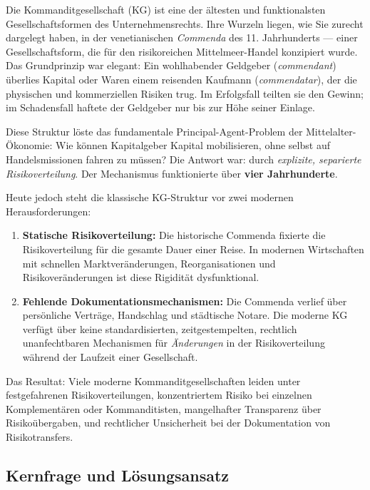 \documentclass[a4paper,12pt]{article}
\theoremstyle{definition}
\begin{document}
Die Kommanditgesellschaft (KG) ist eine der ältesten und funktionalsten Gesellschaftsformen des Unternehmensrechts. Ihre Wurzeln liegen, wie Sie zurecht dargelegt haben, in der venetianischen \emph{Commenda} des 11. Jahrhunderts --- einer Gesellschaftsform, die für den risikoreichen Mittelmeer-Handel konzipiert wurde. Das Grundprinzip war elegant: Ein wohlhabender Geldgeber (\emph{commendant}) überlies Kapital oder Waren einem reisenden Kaufmann (\emph{commendatar}), der die physischen und kommerziellen Risiken trug. Im Erfolgsfall teilten sie den Gewinn; im Schadensfall haftete der Geldgeber nur bis zur Höhe seiner Einlage.

Diese Struktur löste das fundamentale Principal-Agent-Problem der Mittelalter-Ökonomie: Wie können Kapitalgeber Kapital mobilisieren, ohne selbst auf Handelsmissionen fahren zu müssen? Die Antwort war: durch \emph{explizite, separierte Risikoverteilung}. Der Mechanismus funktionierte über \textbf{vier Jahrhunderte}.

Heute jedoch steht die klassische KG-Struktur vor zwei modernen Herausforderungen:

\begin{enumerate}
    \item \textbf{Statische Risikoverteilung:} Die historische Commenda fixierte die Risikoverteilung für die gesamte Dauer einer Reise. In modernen Wirtschaften mit schnellen Marktveränderungen, Reorganisationen und Risikoveränderungen ist diese Rigidität dysfunktional.
    
    \item \textbf{Fehlende Dokumentationsmechanismen:} Die Commenda verlief über persönliche Verträge, Handschlag und städtische Notare. Die moderne KG verfügt über keine standardisierten, zeitgestempelten, rechtlich unanfechtbaren Mechanismen für \emph{Änderungen} in der Risikoverteilung während der Laufzeit einer Gesellschaft.
\end{enumerate}

Das Resultat: Viele moderne Kommanditgesellschaften leiden unter festgefahrenen Risikoverteilungen, konzentriertem Risiko bei einzelnen Komplementären oder Kommanditisten, mangelhafter Transparenz über Risikoübergaben, und rechtlicher Unsicherheit bei der Dokumentation von Risikotransfers.

\subsection{Kernfrage und Lösungsansatz}
\end{document}
